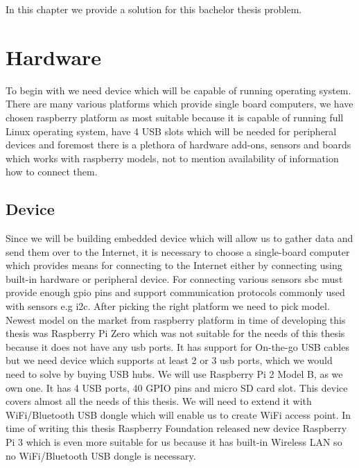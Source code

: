 In this chapter we provide a solution for this bachelor thesis problem.
\section{Hardware}
To begin with we need device which will be capable of running operating system. There are many various platforms which provide single board computers, we have chosen raspberry platform as most suitable because it is capable of running full Linux operating system, have 4 USB slots which will be needed for peripheral devices and foremost there is a plethora of hardware add-ons, sensors and boards which works with raspberry models, not to mention availability of information how to connect them.
\subsection{Device}
Since we will be building embedded device which will allow us to gather data and send them over to the Internet, it is necessary to choose a single-board computer which provides means for connecting to the Internet either by connecting using built-in hardware or peripheral device. For connecting various sensors \gls{sbc} must provide enough \gls{gpio} pins and support communication protocols commonly used with sensors e.g \gls{i2c}.
After picking the right platform we need to pick model. Newest model on the market from raspberry platform in time of developing this thesis was Raspberry Pi Zero which was not suitable for the needs of this thesis because it does not have any usb ports. It has support for On-the-go USB cables but we need device which supports at least 2 or 3 usb ports, which we would need to solve by buying USB hubs. We will use Raspberry Pi 2 Model B, as we own one. It has 4 USB ports, 40 GPIO pins and micro SD card slot. This device covers almost all the needs of this thesis. We will need to extend it with WiFi/Bluetooth USB dongle which will enable us to create WiFi access point. In time of writing this thesis Raspberry Foundation released new device Raspberry Pi 3 which is even more suitable for us because it has built-in Wireless LAN so no WiFi/Bluetooth USB dongle is necessary.
